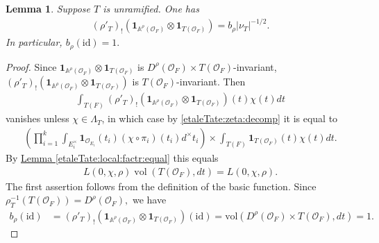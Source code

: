 \documentclass[10pt]{amsart}
\newtheorem{lemma}[theorem]{Lemma}
\theoremstyle{definition}
\numberwithin{equation}{section}
\DeclareMathOperator{\vol}{\mathrm{vol}}
\numberwithin{equation}{subsection}
\newcommand{\calO}{\mathcal{O}}
\begin{document}
\begin{lemma}\label{toric:basic} Suppose $T$ is unramified. One has
\begin{align*}
    (\rho'_T)_!(\mathbf{1}_{\mathbb{A}^\rho(\mathcal{O}_F)}\otimes\mathbf{1}_{T(\mathcal{O}_F)})= b_\rho|\nu_T|^{-1/2}.
\end{align*}
In particular, $b_\rho(\mathrm{id})=1.$
\end{lemma}
\begin{proof} 
Since $\mathbf{1}_{\mathbb{A}^\rho(\mathcal{O}_F)}\otimes\mathbf{1}_{T(\mathcal{O}_F)}$ is $D^\rho(\mathcal{O}_F)\times T(\mathcal{O}_F)$-invariant, $(\rho'_T)_!(\mathbf{1}_{\mathbb{A}^\rho(\mathcal{O}_F)}\otimes\mathbf{1}_{T(\mathcal{O}_F)})$ is $T(\mathcal{O}_F)$-invariant. Then
\begin{align*}
    \int_{T(F)} (\rho'_T)_!(\mathbf{1}_{\mathbb{A}^\rho(\mathcal{O}_F)}\otimes\mathbf{1}_{T(\mathcal{O}_F)})(t)\chi(t)dt
\end{align*}
vanishes unless $\chi\in\Lambda_T$, in which case by \eqref{etaleTate:zeta:decomp} it is equal to
\begin{align*}
    \left(\prod_{i=1}^k \int_{E^\times_i}\mathbf{1}_{\mathcal{O}_{E_i}}(t_i)(\chi\circ\pi_i)(t_i) d^\times t_i\right) \times \int_{T(F)} \mathbf{1}_{T(\mathcal{O}_F)}(t) \chi(t) dt.
\end{align*}
By \hyperref[etaleTate:local:factr:equal]{Lemma \ref{etaleTate:local:factr:equal}} this equals
\begin{align*}
    L(0,\chi,\rho)\vol(T(\mathcal{O}_F),dt) = L(0,\chi,\rho).
\end{align*}
The first assertion follows from the definition of the basic function. Since $\rho_T^{-1}(T(\mathcal{O}_F))=D^\rho(\mathcal{O}_F),$ we have
\begin{align*}
     b_\rho(\mathrm{id})&=(\rho'_T)_!(\mathbf{1}_{\mathbb{A}^\rho(\mathcal{O}_F)}\otimes\mathbf{1}_{T(\mathcal{O}_F)})(\mathrm{id})=\mathrm{vol}(D^\rho(\calO_F)\times T(\mathcal{O}_F),dt)=1.
\end{align*}
\end{proof}
\end{document}
